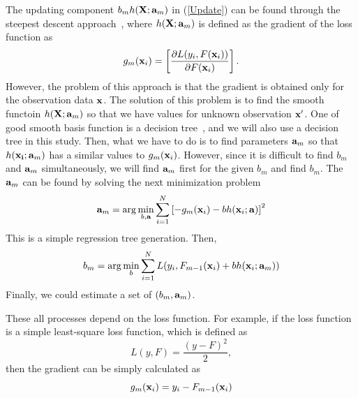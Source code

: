 \documentclass[journal]{IEEEtran} %
\begin{document}
The updating component ${b_m}h({\bf{X}};{{\bf{a}}_m})$ in (\ref{Update}) can be found through the steepest descent approach~\cite{AAA}, where $h({\bf{X}};{{\bf{a}}_m})$ is defined as the gradient of the loss function as
\begin{equation}
\label{Gradient}
{g_m}({{\bf{x}}_i}) = \left[ {\frac{{\partial L({y_i},F({{\bf{x}}_i}))}}{{\partial F({{\bf{x}}_i})}}} \right].
\end{equation}
However, the problem of this approach is that the gradient is obtained only for the observation data $\bf{x}$.
The solution of this problem is to find the smooth functoin $h({\bf{X}};{{\bf{a}}_m})$ so that we have values for unknown observation $\bf{x}'$. One of good smooth basis function is a decision tree~\cite{WWW}, and we will also use a decision tree in this study. Then, what we have to do is to find parameters ${\bf{a}}_m$ so that $h({\bf{x}_i};{{\bf{a}}_m})$ has a similar values to ${g_m}({{\bf{x}}_i})$. However, since it is difficult to find $b_m$ and ${\bf{a}}_m$ simultaneously, we will find ${\bf{a}}_m$ first for the given $b_m$ and find $b_m$.
The ${\bf{a}}_m$ can be found by solving the next minimization problem
\begin{equation}
\label{Afinding}
{{\bf{a}}_m} = \arg \mathop {\min }\limits_{b,{\bf{a}}} \sum\limits_{i = 1}^N {{{\left[ { - {g_m}({{\bf{x}}_i}) - bh({{\bf{x}}_i};{\bf{a}})} \right]}^2}}
\end{equation}
This is a simple regression tree generation. Then, 
\begin{equation}
\label{Bfinding}
{b_m} = \arg \mathop {\min }\limits_b \sum\limits_{i = 1}^N {L({y_i},{F_{m - 1}}({{\bf{x}}_i}) + bh({{\bf{x}}_i};{{\bf{a}}_m}))}
\end{equation}
Finally, we could estimate a set of $({b_m},{{\bf{a}}_m})$.





These all processes depend on the loss function. For example, if the loss function is a simple least-square loss function, which is defined as  
\begin{equation}
\label{LeastSquare}
L(y,F) = \frac{{{{\left( {y - F} \right)}^2}}}{2},
\end{equation}
then the gradient can be simply calculated as 
\begin{equation}
\label{LSgradient}
{g_m}({{\bf{x}}_i}) = {y_i} - {F_{m - 1}}({{\bf{x}}_i})
\end{equation}
\end{document}
